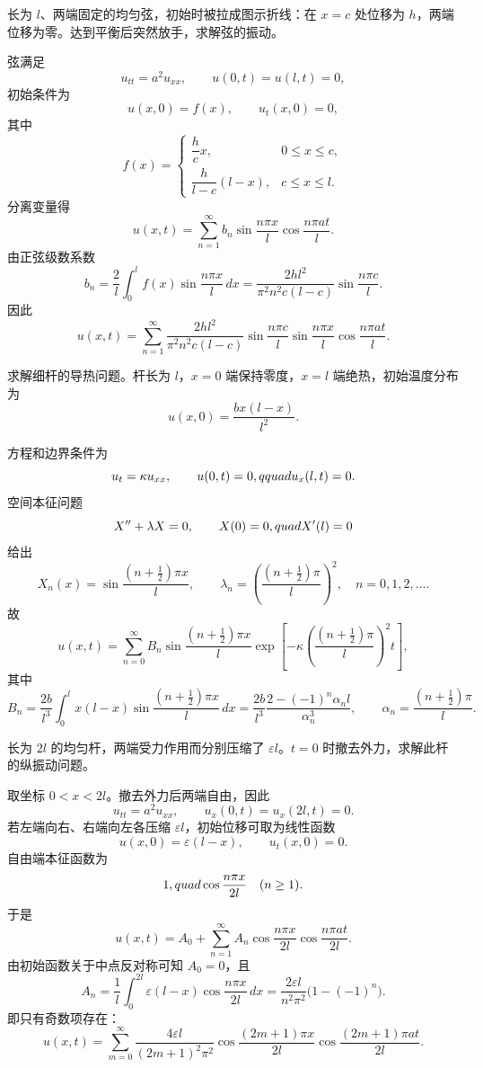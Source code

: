 ﻿


\begin{question}
长为 \(l\)、两端固定的均匀弦，初始时被拉成图示折线：在 \(x=c\) 处位移为 \(h\)，两端位移为零。达到平衡后突然放手，求解弦的振动。
\begin{solution}
弦满足
\[
u_{tt}=a^2u_{xx},\qquad u(0,t)=u(l,t)=0,
\]
初始条件为
\[
u(x,0)=f(x),\qquad u_t(x,0)=0,
\]
其中
\[
f(x)=
\begin{cases}
\dfrac{h}{c}x,&0\le x\le c,\\
\dfrac{h}{l-c}(l-x),&c\le x\le l.
\end{cases}
\]
分离变量得
\[
u(x,t)=\sum_{n=1}^{\infty}b_n\sin\frac{n\pi x}{l}\cos\frac{n\pi at}{l}.
\]
由正弦级数系数
\[
b_n=\frac{2}{l}\int_0^l f(x)\sin\frac{n\pi x}{l}\,dx
=\frac{2hl^2}{\pi^2n^2c(l-c)}\sin\frac{n\pi c}{l}.
\]
因此
\[
u(x,t)=\sum_{n=1}^{\infty}
\frac{2hl^2}{\pi^2n^2c(l-c)}\sin\frac{n\pi c}{l}
\sin\frac{n\pi x}{l}\cos\frac{n\pi at}{l}.
\]
\end{solution}
\end{question}

\begin{question}
求解细杆的导热问题。杆长为 \(l\)，\(x=0\) 端保持零度，\(x=l\) 端绝热，初始温度分布为
\[
u(x,0)=\frac{b x(l-x)}{l^2}.
\]
\begin{solution}
方程和边界条件为
\[
u_t=\kappa u_{xx},\qquad u(0,t)=0,\\qquad u_x(l,t)=0.
\]
空间本征问题
\[X''+\lambda X=0,\qquad X(0)=0,\\quad X'(l)=0
\]
给出
\[
X_n(x)=\sin\frac{(n+\frac12)\pi x}{l},\qquad
\lambda_n=\left(\frac{(n+\frac12)\pi}{l}\right)^2,
\quad n=0,1,2,\ldots .
\]
故
\[
u(x,t)=\sum_{n=0}^{\infty}B_n
\sin\frac{(n+\frac12)\pi x}{l}
\exp\left[-\kappa\left(\frac{(n+\frac12)\pi}{l}\right)^2t\right],
\]
其中
\[
B_n=\frac{2b}{l^3}\int_0^l x(l-x)
\sin\frac{(n+\frac12)\pi x}{l}\,dx
=\frac{2b}{l^3}\frac{2-(-1)^n\alpha_nl}{\alpha_n^3},
\qquad
\alpha_n=\frac{(n+\frac12)\pi}{l}.
\]
\end{solution}
\end{question}

\begin{question}
长为 \(2l\) 的均匀杆，两端受力作用而分别压缩了 \(\varepsilon l\)。\(t=0\) 时撤去外力，求解此杆的纵振动问题。
\begin{solution}
取坐标 \(0<x<2l\)。撤去外力后两端自由，因此
\[
u_{tt}=a^2u_{xx},\qquad u_x(0,t)=u_x(2l,t)=0.
\]
若左端向右、右端向左各压缩 \(\varepsilon l\)，初始位移可取为线性函数
\[
u(x,0)=\varepsilon(l-x),\qquad u_t(x,0)=0.
\]
自由端本征函数为
\[
1,\\quad \cos\frac{n\pi x}{2l}\quad(n\ge1).
\]
于是
\[
u(x,t)=A_0+\sum_{n=1}^{\infty}A_n
\cos\frac{n\pi x}{2l}\cos\frac{n\pi at}{2l}.
\]
由初始函数关于中点反对称可知 \(A_0=0\)，且
\[
A_n=\frac1l\int_0^{2l}\varepsilon(l-x)\cos\frac{n\pi x}{2l}\,dx
=\frac{2\varepsilon l}{n^2\pi^2}\bigl(1-(-1)^n\bigr).
\]
即只有奇数项存在：
\[
u(x,t)=\sum_{m=0}^{\infty}
\frac{4\varepsilon l}{(2m+1)^2\pi^2}
\cos\frac{(2m+1)\pi x}{2l}
\cos\frac{(2m+1)\pi at}{2l}.
\]
\end{solution}
\end{question}

